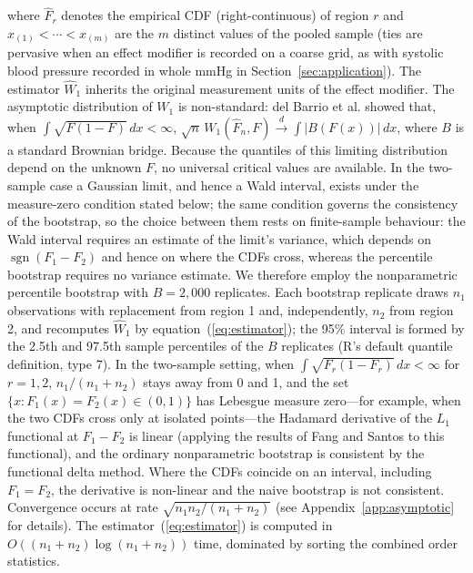 \documentclass[AMA,Times1COL]{WileyNJDv5}
\begin{document}
where $\hat{F}_r$ denotes the empirical CDF (right-continuous) of region $r$ and $x_{(1)} < \cdots < x_{(m)}$ are the $m$ distinct values of the pooled sample (ties are pervasive when an effect modifier is recorded on a coarse grid, as with systolic blood pressure recorded in whole mmHg in Section~\ref{sec:application}). The estimator $\widehat{W}_1$ inherits the original measurement units of the effect modifier. The asymptotic distribution of $W_1$ is non-standard: del Barrio et al.\cite{delbarrio1999} showed that, when $\int \sqrt{F(1-F)}\,dx < \infty$, $\sqrt{n}\,W_1(\hat{F}_n, F) \xrightarrow{d} \int |B(F(x))|\,dx$, where $B$ is a standard Brownian bridge. Because the quantiles of this limiting distribution depend on the unknown $F$, no universal critical values are available. In the two-sample case a Gaussian limit, and hence a Wald interval, exists under the measure-zero condition stated below; the same condition governs the consistency of the bootstrap, so the choice between them rests on finite-sample behaviour: the Wald interval requires an estimate of the limit's variance, which depends on $\operatorname{sgn}(F_1 - F_2)$ and hence on where the CDFs cross, whereas the percentile bootstrap requires no variance estimate. We therefore employ the nonparametric percentile bootstrap with $B = 2{,}000$ replicates.\cite{efron1993} Each bootstrap replicate draws $n_1$ observations with replacement from region 1 and, independently, $n_2$ from region 2, and recomputes $\widehat{W}_1$ by equation~(\ref{eq:estimator}); the 95\% interval is formed by the 2.5th and 97.5th sample percentiles of the $B$ replicates (R's default quantile definition, type 7). In the two-sample setting, when $\int \sqrt{F_r(1 - F_r)}\,dx < \infty$ for $r = 1, 2$, $n_1/(n_1 + n_2)$ stays away from 0 and 1, and the set $\{x : F_1(x) = F_2(x) \in (0,1)\}$ has Lebesgue measure zero---for example, when the two CDFs cross only at isolated points---the Hadamard derivative of the $L_1$ functional at $F_1 - F_2$ is linear (applying the results of Fang and Santos to this functional), and the ordinary nonparametric bootstrap is consistent by the functional delta method.\cite{fang2019} Where the CDFs coincide on an interval, including $F_1 = F_2$, the derivative is non-linear and the naive bootstrap is not consistent.\cite{dumbgen1993,fang2019,sommerfeld2018} Convergence occurs at rate $\sqrt{n_1 n_2/(n_1+n_2)}$ (see Appendix~\ref{app:asymptotic} for details). The estimator~(\ref{eq:estimator}) is computed in $O((n_1 + n_2) \log(n_1 + n_2))$ time, dominated by sorting the combined order statistics.
\end{document}

